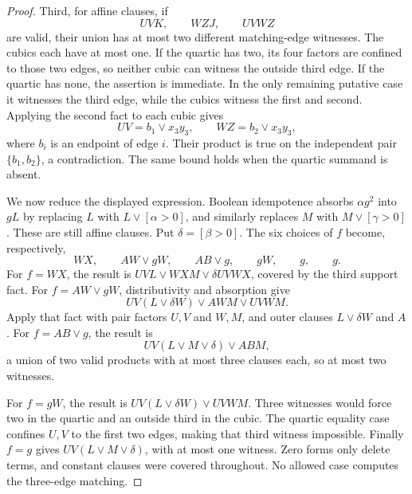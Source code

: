 \documentclass[11pt]{article}
\theoremstyle{definition}
\theoremstyle{remark}
\begin{document}
\begin{proof}
Third, for affine clauses, if
\[
 UVK,\qquad WZJ,\qquad UVWZ
\]
are valid, their union has at most two different matching-edge witnesses. The cubics each have at most one. If the quartic has two, its four factors are confined to those two edges, so neither cubic can witness the outside third edge. If the quartic has none, the assertion is immediate. In the only remaining putative case it witnesses the third edge, while the cubics witness the first and second. Applying the second fact to each cubic gives
\[
 UV=b_1\vee x_3y_3,\qquad WZ=b_2\vee x_3y_3,
\]
where $b_i$ is an endpoint of edge $i$. Their product is true on the independent pair $\{b_1,b_2\}$, a contradiction. The same bound holds when the quartic summand is absent.

We now reduce the displayed expression. Boolean idempotence absorbs $\alpha g^2$ into $gL$ by replacing $L$ with $L\vee[\alpha>0]$, and similarly replaces $M$ with $M\vee[\gamma>0]$. These are still affine clauses. Put $\delta=[\beta>0]$. The six choices of $f$ become, respectively,
\[
 WX,\qquad AW\vee gW,\qquad AB\vee g,\qquad gW,\qquad g,\qquad g.
\]
For $f=WX$, the result is $UVL\vee WXM\vee\delta UVWX$, covered by the third support fact. For $f=AW\vee gW$, distributivity and absorption give
\[
 UV(L\vee\delta W)\vee AWM\vee UVWM.
\]
Apply that fact with pair factors $U,V$ and $W,M$, and outer clauses $L\vee\delta W$ and $A$. For $f=AB\vee g$, the result is
\[
 UV(L\vee M\vee\delta)\vee ABM,
\]
a union of two valid products with at most three clauses each, so at most two witnesses.

For $f=gW$, the result is $UV(L\vee\delta W)\vee UVWM$. Three witnesses would force two in the quartic and an outside third in the cubic. The quartic equality case confines $U,V$ to the first two edges, making that third witness impossible. Finally $f=g$ gives $UV(L\vee M\vee\delta)$, with at most one witness. Zero forms only delete terms, and constant clauses were covered throughout. No allowed case computes the three-edge matching.
\end{proof}
\end{document}
